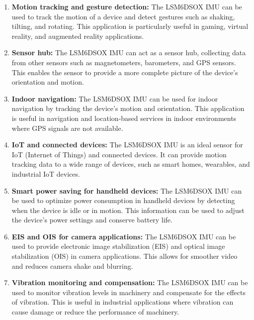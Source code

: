 \begin{enumerate}
	\item \textbf{Motion tracking and gesture detection:} The LSM6DSOX IMU can be used to track the motion of a device and detect gestures such as shaking, tilting, and rotating. This application is particularly useful in gaming, virtual reality, and augmented reality applications.
	
	\item \textbf{Sensor hub:} The LSM6DSOX IMU can act as a sensor hub, collecting data from other sensors such as magnetometers, barometers, and GPS sensors. This enables the sensor to provide a more complete picture of the device's orientation and motion.\cite{Stefanicka:2017}
	
	\item \textbf{Indoor navigation:} The LSM6DSOX IMU can be used for indoor navigation by tracking the device's motion and orientation. This application is useful in navigation and location-based services in indoor environments where GPS signals are not available.
	
	\item \textbf{IoT and connected devices:} The LSM6DSOX IMU is an ideal sensor for IoT (Internet of Things) and connected devices. It can provide motion tracking data to a wide range of devices, such as smart homes, wearables, and industrial IoT devices.\cite{Tripathy:2022}
	
	\item \textbf{Smart power saving for handheld devices:} The LSM6DSOX IMU can be used to optimize power consumption in handheld devices by detecting when the device is idle or in motion. This information can be used to adjust the device's power settings and conserve battery life.
	
	\item \textbf{EIS and OIS for camera applications:} The LSM6DSOX IMU can be used to provide electronic image stabilization (EIS) and optical image stabilization (OIS) in camera applications. This allows for smoother video and reduces camera shake and blurring.
	
	\item \textbf{Vibration monitoring and compensation:} The LSM6DSOX IMU can be used to monitor vibration levels in machinery and compensate for the effects of vibration. This is useful in industrial applications where vibration can cause damage or reduce the performance of machinery.
\end{enumerate}



